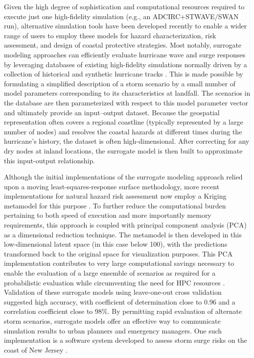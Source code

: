 Given the high degree of sophistication and computational resources required to execute just one high-fidelity simulation (e.g., an ADCIRC+STWAVE/SWAN run), alternative simulation tools have been developed recently to enable a wider range of users to employ these models for hazard characterization, risk assessment, and design of coastal protective strategies. Most notably, surrogate modeling approaches can efficiently evaluate hurricane wave and surge responses by leveraging databases of existing high-fidelity simulations normally driven by a collection of historical and synthetic hurricane tracks \citep{usace2015north}. This is made possible by formulating a simplified description of a storm scenario by a small number of model parameters corresponding to its characteristics at landfall. The scenarios in the database are then parameterized with respect to this model parameter vector and ultimately provide an input–output dataset. Because the geospatial representation often covers a regional coastline (typically represented by a large number of nodes) and resolves the coastal hazards at different times during the hurricane’s history, the dataset is often high-dimensional. After correcting for any dry nodes at inland locations, the surrogate model is then built to approximate this input-output relationship. 

Although the initial implementations of the surrogate modeling approach relied upon a moving least-squares-response surface methodology, more recent implementations for natural hazard risk assessment now employ a Kriging metamodel for this purpose \citep{jia2013kriging}. To further reduce the computational burden pertaining to both speed of execution and more importantly memory requirements, this approach is coupled with principal component analysis (PCA) as a dimensional reduction technique. The metamodel is then developed in this low-dimensional latent space (in this case below 100), with the predictions transformed back to the original space for visualization purposes. This PCA implementation contributes to very large computational savings necessary to enable the evaluation of a large ensemble of scenarios as required for a probabilistic evaluation while circumventing the need for HPC resources \citep{jia2013kriging}. Validation of these surrogate models using leave-one-out cross validation \citep{taflanidis2017a} suggested high accuracy, with coefficient of determination close to 0.96 and a correlation coefficient close to 98\%. By permitting rapid evaluation of alternate storm scenarios, surrogate models offer an effective way to communicate simulation results to urban planners and emergency managers. One such implementation is a software system developed to assess storm surge risks on the coast of New Jersey \citep{njcoast2018implementation}.

